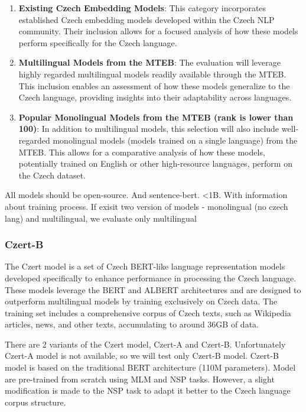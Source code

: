 \begin{enumerate}
  \item \textbf{Existing Czech Embedding Models}: This category incorporates established Czech embedding models developed within the Czech NLP community. Their inclusion allows for a focused analysis of how these models perform specifically for the Czech language.
  \item \textbf{Multilingual Models from the \ac{MTEB}}: The evaluation will leverage highly regarded multilingual models readily available through the \ac{MTEB}. This inclusion enables an assessment of how these models generalize to the Czech language, providing insights into their adaptability across languages.
  \item \textbf{Popular Monolingual Models from the \ac{MTEB} (rank is lower than 100)}: In addition to multilingual models, this selection will also include well-regarded monolingual models (models trained on a single language) from the \ac{MTEB}. This allows for a comparative analysis of how these models, potentially trained on English or other high-resource languages, perform on the Czech dataset.
\end{enumerate}

All models should be open-source. And sentence-bert. <1B. With information about training process.
If exisit two version of models - monolingual (no czech lang) and multilingual, we evaluate only multilingual

\subsubsection{Czert-B \cite{czert}}

The Czert model is a set of Czech \ac{BERT}-like language representation models developed specifically to enhance performance in processing the Czech language.
These models leverage the \ac{BERT} and \ac{ALBERT} \cite{ALBERT} architectures and are designed to outperform multilingual models by training exclusively on Czech data.
The training set includes a comprehensive corpus of Czech texts, such as Wikipedia articles, news, and other texts, accumulating to around 36GB of data.

There are 2 variants of the Czert model, Czert-A and Czert-B. Unfortunately Czert-A model is not available, so we will test only Czert-B model.
Czert-B model is based on the traditional \ac{BERT} architecture (110M parameters).
Model are pre-trained from scratch using \ac{MLM} and \ac{NSP} tasks. However, a slight modification is made to the \ac{NSP} task to adapt it better to the Czech language corpus structure.

